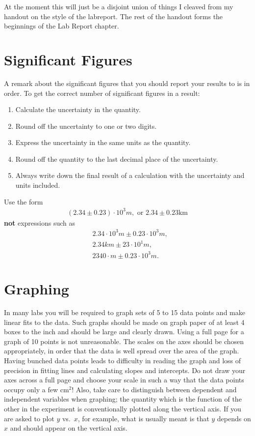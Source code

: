 At the moment this will just be a disjoint union of things I cleaved from my 
handout on the style of the labreport. The rest of the handout forms the 
beginnings of the Lab Report chapter. 

\section{Significant Figures}

A remark about the significant figures that you should report your 
results to is in order. To get the correct number of significant figures 
in a result:  
\begin{enumerate} 
\item Calculate the uncertainty in the quantity.
\item Round off the uncertainty to one or two digits.
\item Express the uncertainty in the same units as the quantity.
\item Round off the quantity to the last decimal place of the uncertainty.
\item Always write down the final result of a calculation with the uncertainty
and units included. 
\end{enumerate}
Use the form 
\begin{eqnarray}
(2.34 \pm 0.23) \cdot 10^3 m, \mbox{ or } 2.34 \pm 0.23 \mbox{km} \nonumber 
\end{eqnarray}
{\bf not} expressions such as 
\begin{eqnarray}
& 2.34 \cdot 10^3 m \pm 0.23 \cdot 10^3 m, \nonumber \\
& 2.34  km \pm 23 \cdot 10^1 m, \nonumber \\
& 2340 \cdot m \pm 0.23 \cdot 10^3 m. \nonumber
\end{eqnarray}

\section{Graphing}
 
In many labs you will be required to graph sets of 5 to 15 data points and make
linear fits to the data.  Such graphs should be made on graph paper of at least
4 boxes to the inch and should be large and clearly drawn.  Using a full page 
for a graph of 10 points is not unreasonable.  The scales on the axes should be
chosen appropriately,  in order that the data is well spread over the area of 
the graph. Having bunched data points leads to difficulty in reading the graph 
and loss of precision in fitting lines and calculating slopes and intercepts.  
Do not draw your axes across a full page and choose your scale in such a way 
that the data points occupy only a few cm$^2$!  Also, take care to distinguish 
between dependent and independent variables when graphing;  the quantity which 
is the function of the other in the experiment is conventionally plotted along 
the vertical axis.  If you are asked to plot $y$ vs.\ $x$,  for example,  what 
is usually meant is that $y$ depends on $x$ and should appear on the vertical 
axis.

